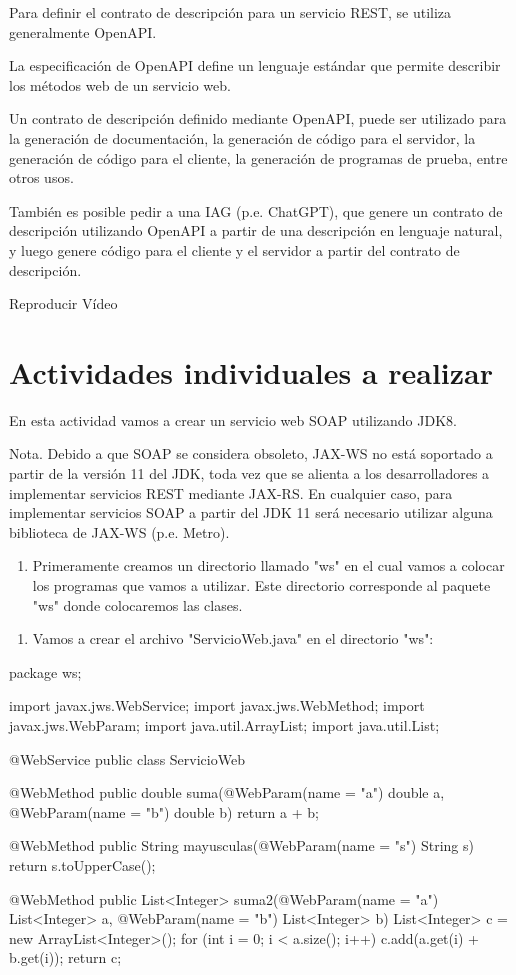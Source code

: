 Para definir el contrato de descripción para un servicio REST, se utiliza generalmente OpenAPI.

La especificación de OpenAPI define un lenguaje estándar que permite describir los métodos web de un servicio web.

Un contrato de descripción definido mediante OpenAPI, puede ser utilizado para la generación de documentación, la generación de código para el servidor, la generación de código para el cliente, la generación de programas de prueba, entre otros usos.

También es posible pedir a una IAG (p.e. ChatGPT), que genere un contrato de descripción utilizando OpenAPI a partir de una descripción en lenguaje natural, y luego genere código para el cliente y el servidor a partir del contrato de descripción.

Reproducir Vídeo

\chapter{Actividades individuales a realizar}

En esta actividad vamos a crear un servicio web SOAP utilizando JDK8.

Nota. Debido a que SOAP se considera obsoleto, JAX-WS no está soportado a partir de la versión 11 del JDK, toda vez que se alienta a los desarrolladores a implementar servicios REST mediante JAX-RS. En cualquier caso, para implementar servicios SOAP a partir del JDK 11 será necesario utilizar alguna biblioteca de JAX-WS (p.e. Metro).

\begin{enumerate}
\item Primeramente creamos un directorio llamado "ws" en el cual vamos a colocar los programas que vamos a utilizar. Este directorio corresponde al paquete "ws" donde colocaremos las clases.
\end{enumerate}

\begin{enumerate}
\item Vamos a crear el archivo "ServicioWeb.java" en el directorio "ws":
\end{enumerate}

\begin{SourceCode}
package ws;

import javax.jws.WebService;
import javax.jws.WebMethod;
import javax.jws.WebParam;
import java.util.ArrayList;
import java.util.List;

@WebService
public class ServicioWeb {

@WebMethod
public double suma(@WebParam(name = "a") double a, @WebParam(name = "b") double b) {
return a + b;
}

@WebMethod
public String mayusculas(@WebParam(name = "s") String s) {
return s.toUpperCase();
}

@WebMethod
public List<Integer> suma2(@WebParam(name = "a") List<Integer> a, @WebParam(name = "b") List<Integer> b) {
List<Integer> c = new ArrayList<Integer>();
for (int i = 0; i < a.size(); i++)
    c.add(a.get(i) + b.get(i));
return c;
}
}
\end{SourceCode}

